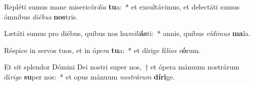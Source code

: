 \item Repléti sumus mane misericór\textit{di}\textit{a} \textbf{tu}a:~* et exsultávimus, et delectáti sumus ómnibus \textit{di}\textit{é}\textit{bus} \textbf{nos}tris.
\item Lætáti sumus pro diébus, quibus nos hu\textit{mi}\textit{li}\textbf{ás}ti:~* annis, quibus \textit{ví}\textit{di}\textit{mus} \textbf{ma}la.
\item Réspice in servos tuos, et in ó\textit{pe}\textit{ra} \textbf{tu}a:~* et dírige fí\textit{li}\textit{os} \textit{e}\textbf{ó}rum.
\item Et sit splendor Dómini Dei nostri super nos,~† et ópera mánuum nostrárum dí\textit{ri}\textit{ge} \textbf{su}per nos:~* et opus mánuum \textit{nos}\textit{trá}\textit{rum} \textbf{dí}\textbf{ri}ge.
